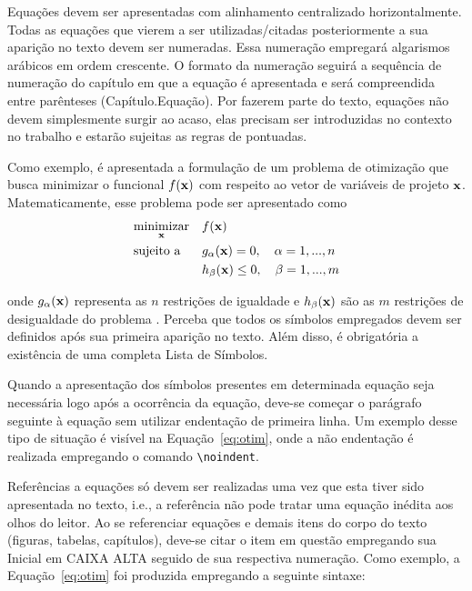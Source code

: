 Equações devem ser apresentadas com alinhamento centralizado horizontalmente. Todas as equações que vierem a ser utilizadas/citadas posteriormente a sua aparição no texto devem ser numeradas. Essa numeração empregará algarismos arábicos em ordem crescente. O formato da numeração seguirá a sequência de numeração do capítulo em que a equação é apresentada e será compreendida entre parênteses (Capítulo.Equação). Por fazerem parte do texto, equações não devem simplesmente surgir ao acaso, elas precisam ser introduzidas no contexto no trabalho e estarão sujeitas as regras de pontuadas.

Como exemplo, é apresentada a formulação de um problema de otimização que busca minimizar o funcional $f(\vb{x})$ com respeito ao vetor de variáveis de projeto $\vb{x}$. Matematicamente, esse problema pode ser apresentado como
\begin{equation} \label{eq:otim}
	\begin{aligned}
		& \underset{\vb{x}}{\text{minimizar}}
		& & f(\vb{x}) \\
		& \text{sujeito a}
		&& g_{\alpha}(\vb{x}) = 0, \quad \alpha = 1,..., n\\
		& && h_{\beta}(\vb{x}) \leq 0, \quad \beta = 1,..., m
	\end{aligned}
\end{equation}

\noindent onde $g_{\alpha}(\vb{x})$ representa as $n$ restrições de igualdade e $h_{\beta}(\vb{x})$ são as $m$ restrições de desigualdade do problema \citep{arora2011introduction,bendsoe2013topology}. Perceba que todos os símbolos empregados devem ser definidos após sua primeira aparição no texto. Além disso, é obrigatória a existência de uma completa Lista de Símbolos.

Quando a apresentação dos símbolos presentes em determinada equação seja necessária logo após a ocorrência da equação, deve-se começar o parágrafo seguinte à equação sem utilizar endentação de primeira linha. Um exemplo desse tipo de situação é visível na Equação~\ref{eq:otim}, onde a não endentação é realizada empregando o comando \verb|\noindent|.

Referências a equações só devem ser realizadas uma vez que esta tiver sido apresentada no texto, i.e., a referência não pode tratar uma equação inédita aos olhos do leitor. Ao se referenciar equações e demais itens do corpo do texto (figuras, tabelas, capítulos), deve-se citar o item em questão empregando sua Inicial em CAIXA ALTA seguido de sua respectiva numeração. Como exemplo, a Equação~\ref{eq:otim} foi produzida empregando a seguinte sintaxe:

